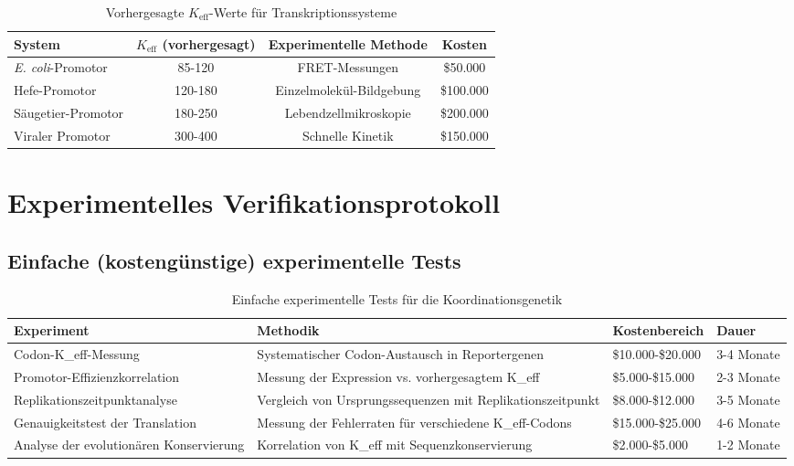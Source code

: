 \documentclass[12pt]{article}
\begin{document}
	\begin{table}[H]
		\centering
		\caption{Vorhergesagte $K_{\text{eff}}$-Werte für Transkriptionssysteme}
		\begin{tabular}{lccc}
			\toprule
			\textbf{System} & \textbf{$K_{\text{eff}}$ (vorhergesagt)} & \textbf{Experimentelle Methode} & \textbf{Kosten} \\
			\midrule
			\textit{E. coli}-Promotor & 85-120 & FRET-Messungen & \$50.000 \\
			Hefe-Promotor & 120-180 & Einzelmolekül-Bildgebung & \$100.000 \\
			Säugetier-Promotor & 180-250 & Lebendzellmikroskopie & \$200.000 \\
			Viraler Promotor & 300-400 & Schnelle Kinetik & \$150.000 \\
			\bottomrule
		\end{tabular}
	\end{table}
	
	\section{Experimentelles Verifikationsprotokoll}
	
	\subsection{Einfache (kostengünstige) experimentelle Tests}
	
	\begin{table}[H]
		\centering
		\caption{Einfache experimentelle Tests für die Koordinationsgenetik}
		\begin{tabular}{p{4cm}p{5cm}p{3cm}p{2cm}}
			\toprule
			\textbf{Experiment} & \textbf{Methodik} & \textbf{Kostenbereich} & \textbf{Dauer} \\
			\midrule
			Codon-K\_eff-Messung & Systematischer Codon-Austausch in Reportergenen & \$10.000-\$20.000 & 3-4 Monate \\
			Promotor-Effizienzkorrelation & Messung der Expression vs. vorhergesagtem K\_eff & \$5.000-\$15.000 & 2-3 Monate \\
			Replikationszeitpunktanalyse & Vergleich von Ursprungssequenzen mit Replikationszeitpunkt & \$8.000-\$12.000 & 3-5 Monate \\
			Genauigkeitstest der Translation & Messung der Fehlerraten für verschiedene K\_eff-Codons & \$15.000-\$25.000 & 4-6 Monate \\
			Analyse der evolutionären Konservierung & Korrelation von K\_eff mit Sequenzkonservierung & \$2.000-\$5.000 & 1-2 Monate \\
			\bottomrule
		\end{tabular}
	\end{table}
	
\end{document}
